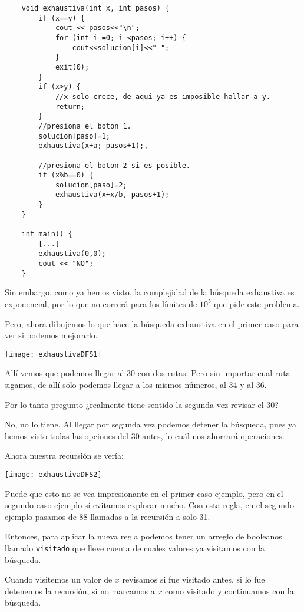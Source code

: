 \begin{lstlisting}
	void exhaustiva(int x, int pasos) {
		if (x==y) {
			cout << pasos<<"\n";
			for (int i =0; i <pasos; i++) {
				cout<<solucion[i]<<" ";
			}			
			exit(0);
		}
		if (x>y) {
			//x solo crece, de aqui ya es imposible hallar a y.
			return;
		}
		//presiona el boton 1.
		solucion[paso]=1;
		exhaustiva(x+a; pasos+1);,
		
		//presiona el boton 2 si es posible.
		if (x%b==0) {
			solucion[paso]=2;
			exhaustiva(x+x/b, pasos+1);
		}
	}

	int main() {
		[...]
		exhaustiva(0,0);
		cout << "NO";
	}
\end{lstlisting}

Sin embargo, como ya hemos visto, la complejidad de la búsqueda exhaustiva es exponencial, por lo que no correrá para los límites de \(10^5\) que pide este problema. 

Pero, ahora dibujemos lo que hace la búsqueda exhaustiva en el primer caso para ver si podemos mejorarlo.

\begin{center}
	\texttt{[image: exhaustivaDFS1]}
\end{center}

Allí vemos que podemos llegar al 30 con dos rutas. Pero sin importar cual ruta sigamos, de allí solo podemos llegar a los mismos números, al 34 y al 36.

Por lo tanto pregunto ¿realmente tiene sentido la segunda vez revisar el 30?

No, no lo tiene. Al llegar por segunda vez podemos detener la búsqueda, pues ya hemos visto todas las opciones del 30 antes, lo cuál nos ahorrará operaciones.

Ahora nuestra recursión se vería:

\begin{center}
	\texttt{[image: exhaustivaDFS2]}
\end{center}

Puede que esto no se vea impresionante en el primer caso ejemplo, pero en el segundo caso ejemplo sí evitamos explorar mucho. Con esta regla, en el segundo ejemplo pasamos de 88 llamadas a la recursión a solo 31.

Entonces, para aplicar la nueva regla podemos tener un arreglo de booleanos llamado \verb|visitado| que lleve cuenta de cuales valores ya visitamos con la búsqueda.

Cuando visitemos un valor de \(x\) revisamos si fue visitado antes, si lo fue detenemos la recursión, si no marcamos a \(x\) como visitado y continuamos con la búsqueda.

